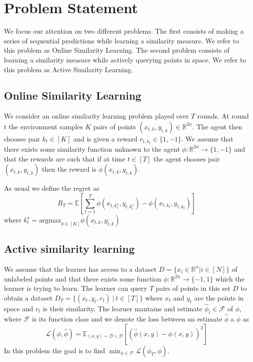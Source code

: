 \documentclass{article}
\begin{document}
\section{Problem Statement}
\label{problem-statement}
We focus our attention on two different problems.
The first consists of making a series of sequential predictions while learning a
similarity measure. We refer to this problem as Online Similarity Learning.
The second problem consists of learning a similarity measure while actively querying points in space.
We refer to this problem as Active Similarity Learning.

\subsection{Online Similarity Learning}
\label{problem-statement:online-similarity-learning}
We consider an online similarity learning problem played over $T$ rounds.
At round $t$ the environment samples $K$ pairs of points $(x_{t,k}, y_{t,k}) \in \mathbb{R}^{2n}$.
The agent then chooses pair $k_t \in [K]$ and is given a reward $r_{t,k_{t}} \in \{1, -1\}$.
We assume that there exists some similarity function unknown to the agent $\phi: \mathbb{R}^{2n} \to \{1, -1\}$
and that the rewards are such that if at time $t \in [T]$ the agent chooses pair $(x_{t,k}, y_{t,k})$
then the reward is $\phi(x_{t,k}, y_{t,k})$.

As usual we define the regret as
\[ R_T = \mathbb{E}\left[\sum_{t =1}^T \phi(x_{t,k^\star_t}, y_{t,k^\star_t}) - \phi(x_{t,k_t}, y_{t,k_t})\right]\]
where $k_t^\star = \text{argmax}_{k\in [K]} \phi(x_{t,k}, y_{t,k})$

\subsection{Active similarity learning}
\label{problem-statement:active-similarity-learning}
We assume that the learner has access to a dataset $D = \{x_i \in \mathbb{R}^n| i \in [N]\}$ of unlabeled points and that there exists some function $\phi: \mathbb{R}^{2n} \to \{-1, 1\}$ which the learner is trying to learn.
The learner can query $T$ pairs of points in this set $D$ to obtain a dataset $D_T = \{(x_t, y_t, r_t) ~|  ~t \in [T]\}$  where $x_t$ and $y_t$ are the points in space and $r_t$ is their similarity.
The learner mantains and estimate $\hat{\phi}_t \in \mathcal{F}$ of $\phi$, where $\mathcal{F}$ is its function class and we denote the loss between an estimate $\hat{\phi}$ a $\phi$ as
\[ \mathcal{L}(\phi, \hat{\phi}) = \mathbb{E}_{(x, y) \sim \mathcal{D} \times \mathcal{D}}[(\hat{\phi}(x,y) - \phi(x, y))^2] \]
In this problem the goal is to find $\min_{\phi \in \mathcal{F}} \mathcal{L}(\hat{\phi}_T, \phi)$.
\end{document}
